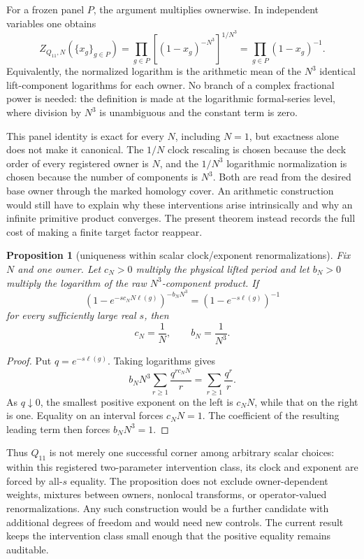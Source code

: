 \documentclass[11pt]{article}
\newtheorem{proposition}[theorem]{Proposition}
\theoremstyle{definition}
\theoremstyle{remark}
\begin{document}
For a frozen panel $P$, the argument multiplies ownerwise. In independent variables one obtains
\[
Z_{Q_{11},N}(\{x_g\}_{g\in P})
=\prod_{g\in P}\left[(1-x_g)^{-N^3}\right]^{1/N^3}
=\prod_{g\in P}(1-x_g)^{-1}.
\]
Equivalently, the normalized logarithm is the arithmetic mean of the $N^3$ identical lift-component logarithms for each owner. No branch of a complex fractional power is needed: the definition is made at the logarithmic formal-series level, where division by $N^3$ is unambiguous and the constant term is zero.

This panel identity is exact for every $N$, including $N=1$, but exactness alone does not make it canonical. The $1/N$ clock rescaling is chosen because the deck order of every registered owner is $N$, and the $1/N^3$ logarithmic normalization is chosen because the number of components is $N^3$. Both are read from the desired base owner through the marked homology cover. An arithmetic construction would still have to explain why these interventions arise intrinsically and why an infinite primitive product converges. The present theorem instead records the full cost of making a finite target factor reappear.

\begin{proposition}[uniqueness within scalar clock/exponent renormalizations]\label{prop:unique-renorm}
Fix $N$ and one owner. Let $c_N>0$ multiply the physical lifted period and let $b_N>0$ multiply the logarithm of the raw $N^3$-component product. If
\[
\left(1-e^{-s c_NN\ell(g)}\right)^{-b_NN^3}
=\left(1-e^{-s\ell(g)}\right)^{-1}
\]
for every sufficiently large real $s$, then
\[
c_N=\frac1N,
\qquad
b_N=\frac1{N^3}.
\]
\end{proposition}

\begin{proof}
Put $q=e^{-s\ell(g)}$. Taking logarithms gives
\[
b_NN^3\sum_{r\geq1}\frac{q^{r c_NN}}r
=\sum_{r\geq1}\frac{q^r}r.
\]
As $q\downarrow0$, the smallest positive exponent on the left is $c_NN$, while that on the right is one. Equality on an interval forces $c_NN=1$. The coefficient of the resulting leading term then forces $b_NN^3=1$.
\end{proof}

Thus $Q_{11}$ is not merely one successful corner among arbitrary scalar choices: within this registered two-parameter intervention class, its clock and exponent are forced by all-$s$ equality. The proposition does not exclude owner-dependent weights, mixtures between owners, nonlocal transforms, or operator-valued renormalizations. Any such construction would be a further candidate with additional degrees of freedom and would need new controls. The current result keeps the intervention class small enough that the positive equality remains auditable.
\end{document}
